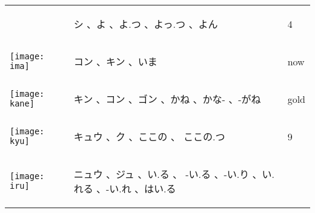 \documentclass[a4paper,12pt]{extarticle}
\begin{document}
\begin{longtable}{|lp{6cm}p{4cm}|}
	                                   &
	\begin{CJK}{UTF8}{min} シ 、よ 、よ.つ 、よっ.つ 、よん\end{CJK}
	                                   &
	4
	\\
	\begin{minipage}{0.3\textwidth}
		\centerline{
			\texttt{[image: ima]}
		}
	\end{minipage}
	                                   &
	\begin{CJK}{UTF8}{min} コン 、キン 、いま\end{CJK}
	                                   &
	now
	\\
	\begin{minipage}{0.3\textwidth}
		\centerline{
			\texttt{[image: kane]}
		}
	\end{minipage}
	                                   &
	\begin{CJK}{UTF8}{min} キン 、コン 、ゴン  、かね 、かな- 、-がね\end{CJK}
	                                   &
	gold
	\\
	\begin{minipage}{0.3\textwidth}
		\centerline{
			\texttt{[image: kyu]}
		}
	\end{minipage}
	                                   &
	\begin{CJK}{UTF8}{min} キュウ 、ク 、ここの 、 ここの.つ\end{CJK}
	                                   &
	9
	\\
	\begin{minipage}{0.3\textwidth}
		\centerline{
			\texttt{[image: iru]}
		}
	\end{minipage}
	                                   &
	\begin{CJK}{UTF8}{min} ニュウ 、ジュ 、い.る 、 -い.る 、-い.り 、い.れる 、-い.れ 、はい.る\end{CJK}

\end{longtable}
\end{document}
